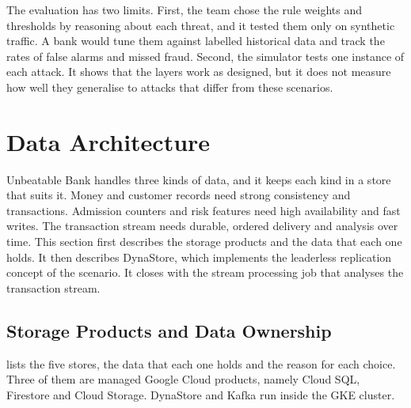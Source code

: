 \documentclass[11pt,a4paper]{article}
\newcommand{\project}{Unbeatable Bank}
\begin{document}
The evaluation has two limits. First, the team chose the rule weights and thresholds by reasoning about each threat, and it tested them only on synthetic traffic. A bank would tune them against labelled historical data and track the rates of false alarms and missed fraud. Second, the simulator tests one instance of each attack. It shows that the layers work as designed, but it does not measure how well they generalise to attacks that differ from these scenarios.

\section{Data Architecture}
\label{sec:data}

\project{} handles three kinds of data, and it keeps each kind in a store that suits it. Money and customer records need strong consistency and transactions. Admission counters and risk features need high availability and fast writes. The transaction stream needs durable, ordered delivery and analysis over time. This section first describes the storage products and the data that each one holds. It then describes DynaStore, which implements the leaderless replication concept of the scenario. It closes with the stream processing job that analyses the transaction stream.

\subsection{Storage Products and Data Ownership}
\label{sec:storage}

 lists the five stores, the data that each one holds and the reason for each choice. Three of them are managed Google Cloud products, namely Cloud SQL, Firestore and Cloud Storage. DynaStore and Kafka run inside the GKE cluster.
\end{document}

